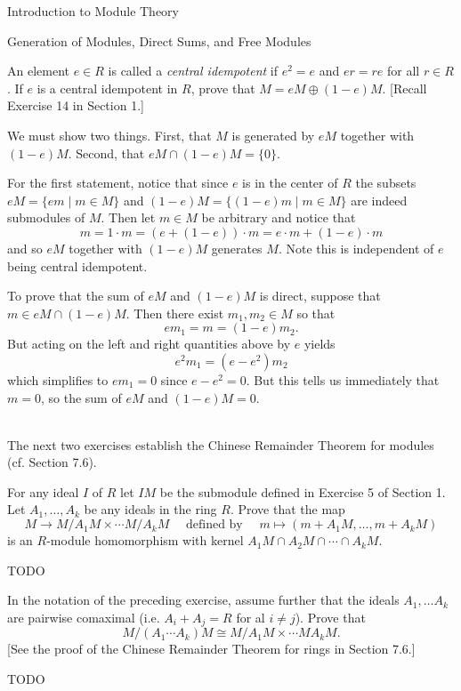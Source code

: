 \begin{chapter}{Introduction to Module Theory}
\begin{section}{Generation of Modules, Direct Sums, and Free Modules}
\begin{solution}
\end{solution}\oneperpage



\begin{problem}\label{ex:10.3.15}
An element $e\in R$ is called a \emph{central idempotent} if $e^2=e$ and $er = re$ for all $r\in R$. If $e$ is a central idempotent in $R$, prove that $M= eM\oplus (1-e)M$. [Recall Exercise 14 in Section 1.]
\end{problem}
\begin{solution}We must show two things. First, that $M$ is generated by $eM$ together with $(1-e)M$. Second, that $eM\cap (1-e)M = \{0\}$. 

For the first statement, notice that since $e$ is in the center of $R$ the subsets $eM = \{em\mid m\in M\}$ and $(1-e)M = \{(1-e)m\mid m\in M\}$ are indeed submodules of $M$. Then let $m\in M$ be arbitrary and notice that \[
m = 1\cdot m = (e+(1-e))\cdot m = e\cdot m + (1-e)\cdot m
\]
and so $eM$ together with $(1-e)M$ generates $M$. Note this is independent of $e$ being central idempotent. 

To prove that the sum of $eM$ and $(1-e)M$ is direct, suppose that $m\in eM\cap (1-e)M$. Then there exist $m_1,m_2\in M$ so that \[
em_1 = m = (1-e)m_2.
\]
But acting on the left and right quantities above by $e$ yields \[
e^2m_1 = (e-e^2)m_2
\]
which simplifies to $em_1 = 0$ since $e-e^2=0$. But this tells us immediately that $m = 0$, so the sum of $eM$ and $(1-e)M = 0$. 
\end{solution}\oneperpage


\quad\\The next two exercises establish the Chinese Remainder Theorem for modules (cf. Section 7.6).

\begin{problem}\label{ex:10.3.16}
For any ideal $I$ of $R$ let $IM$ be the submodule defined in Exercise 5 of Section 1. Let $A_1,\ldots,A_k$ be any ideals in the ring $R$. Prove that the map \[
M\to M/A_1M\times\cdots M/A_k M \quad\text{ defined by }\quad m\mapsto (m+A_1M,\ldots,m+A_kM)
\]
is an $R$-module homomorphism with kernel $A_1M\cap A_2M\cap \cdots \cap A_kM$.
\end{problem}
\begin{solution}TODO

\end{solution}\oneperpage



\begin{problem}\label{ex:10.3.17}
In the notation of the preceding exercise, assume further that the ideals $A_1,\ldots A_k$ are pairwise comaximal (i.e. $A_i+A_j = R$ for al $i\neq j$). Prove that \[
M/(A_1\cdots A_k)M\cong M/A_1M\times \cdots MA_kM.
\]
[See the proof of the Chinese Remainder Theorem for rings in Section 7.6.]
\end{problem}
\begin{solution}TODO


\end{solution}
\end{section}
\end{chapter}
